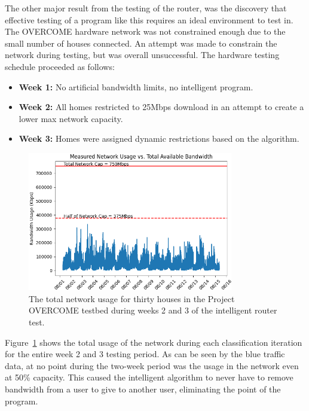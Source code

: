 The other major result from the testing of the router, was the discovery that effective testing of a program like this requires an ideal environment to test in.
The OVERCOME hardware network was not constrained enough due to the small number of houses connected.
An attempt was made to constrain the network during testing, but was overall unsuccessful.
The hardware testing schedule proceeded as follows:
\begin{itemize}
    \item \textbf{Week 1:} No artificial bandwidth limits, no intelligent program.
    \item \textbf{Week 2:} All homes restricted to 25Mbps download in an attempt to create a lower max network capacity.
    \item \textbf{Week 3:} Homes were assigned dynamic restrictions based on the algorithm.
\end{itemize}
\begin{figure}[!ht]
    \centering
    \includegraphics[width=0.8\textwidth,keepaspectratio]{Images/Chpt4/Network_Usage.png}
    \caption{The total network usage for thirty houses in the Project OVERCOME testbed during weeks 2 and 3 of the intelligent router test.}
    \label{max_usage}
\end{figure}
Figure~\ref{max_usage} shows the total usage of the network during each classification iteration for the entire week 2 and 3 testing period.
As can be seen by the blue traffic data, at no point during the two-week period was the usage in the network even at 50\% capacity.
This caused the intelligent algorithm to never have to remove bandwidth from a user to give to another user, eliminating the point of the program.
